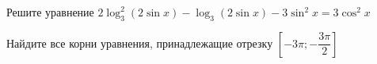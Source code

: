 \begin{ex}
	\begin{condition}
		\begin{enumcols}[label=\asbuk*)]
			\item Решите уравнение \( 2\log_3^2 (2\sin x ) - \log_3 (2\sin x) -3\sin^2 x = 3\cos^2 x \)
			\item Найдите все корни уравнения, принадлежащие отрезку \( \left[-3\pi;-\dfrac{3\pi}{2}\right] \)
		\end{enumcols}
	\end{condition}
\end{ex}